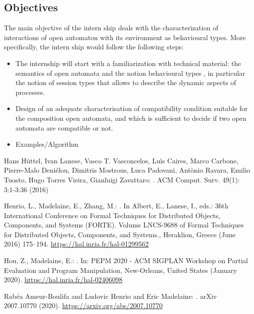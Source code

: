 \documentclass[11pt,fleqn]{article}
\begin{document}
\subsection*{Objectives}

The main objective of the intern ship  deals with the characterization of interactions  of open automaton with its environment as behavioural types.
More specifically, the intern ship would follow the following steps:
\begin{itemize}
\item The internship will start with a familiarization with technical material: the semantics of  open automata and the notion behavioural types \cite{Hans:2016}, in particular the notion of session types that allows to describe the dynamic aspects of processes. 

\item Design of an adequate characterisation of  compatibility condition  suitable for the composition open automata, and which is sufficient to decide if two open automata are compatible or not. 
\item Examples/Algorithm




\end{itemize}
 
\begin{thebibliography}{9}

Hans H\"uttel, Ivan Lanese, Vasco T. Vasconcelos, Lu\`is Caires, Marco Carbone, Pierre-Malo Deni\'elou, Dimitris Mostrous, Luca Padovani, Ant\`onio Ravara, Emilio Tuosto, Hugo Torres Vieira, Gianluigi Zavattaro:
.
\newblock ACM Comput. Surv. 49(1): 3:1-3:36 (2016)



Henrio, L., Madelaine, E., Zhang, M.:
.
\newblock In Albert, E., Lanese, I., eds.: {36th International Conference on
  Formal Techniques for Distributed Objects, Components, and Systems (FORTE)}.
  Volume LNCS-9688 of Formal Techniques for Distributed Objects, Components,
  and Systems., Heraklion, Greece (June 2016)  175--194. 
\newblock  \url{https://hal.inria.fr/hal-01299562}

Hou, Z., Madelaine, E.:
.
\newblock In: {PEPM 2020 - ACM SIGPLAN Workshop on Partial Evaluation and
  Program Manipulation}, New-Orleans, United States (January 2020). 
 \newblock \url{https://hal.inria.fr/hal-02406098}

Rabéa Ameur-Boulifa and Ludovic Henrio and Eric Madelaine:
.
\newblock arXiv {2007.10770} (2020).
 \newblock \url{https://arxiv.org/abs/2007.10770}
\end{thebibliography}
\end{document}
